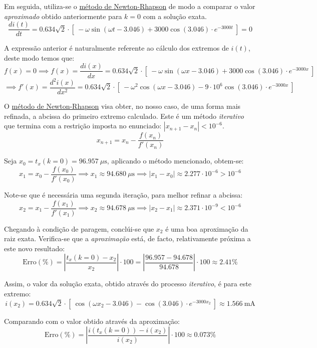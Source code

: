 Em seguida, utiliza-se o \underline{método de Newton-Rhapson} de modo a comparar o valor \textit{aproximado} obtido anteriormente para $k=0$ com a solução exata.
$$
    \frac{di(t)}{dt} = 0.634\sqrt{2}\cdot [\ -\omega\sin{(\omega t - 3.046)} + 3000\cos{(3.046)}\cdot e^{-3000t}\ ] = 0
$$

A expressão anterior é naturalmente referente ao cálculo dos extremos de $i(t)$, deste modo temos que:
$$
    f(x) = 0 \implies f(x) = \frac{di(x)}{dx} = 0.634\sqrt{2}\cdot [\ -\omega\sin{(\omega x - 3.046)} + 3000\cos{(3.046)}\cdot e^{-3000x}\ ]
$$
$$
    \implies f'(x) = \frac{d^2i(x)}{dx^2} = 0.634\sqrt{2}\cdot [\ -\omega^2\cos{(\omega x - 3.046)} - 9\cdot 10^{6}\cos{(3.046)}\cdot e^{-3000x}\ ]
$$

O \underline{método de Newton-Rhapson} visa obter, no nosso caso, de uma forma mais refinada, a abcissa do primeiro extremo calculado. Este é um método \textit{iterativo} que termina com a restrição imposta no enunciado: $\left\vert x_{n+1} - x_n\right\vert < 10^{-6}$.
\begin{equation}
    x_{n+1} = x_n - \frac{f(x_n)}{f'(x_n)}   
\end{equation}

Seja $x_0 = t_x(k=0) = 96.957\ \mu\text{s}$, aplicando o método mencionado, obtem-se:
$$
    x_{1} = x_{0} - \frac{f(x_0)}{f'(x_0)} \implies x_{1} \approx 94.680\ \mu\text{s} \implies \left\vert x_{1} - x_0\right\vert \approx 2.277 \cdot 10^{-6} > 10^{-6}
$$

Note-se que é necessária uma segunda iteração, para melhor refinar a abcissa:
$$
    x_{2} = x_{1} - \frac{f(x_1)}{f'(x_1)} \implies x_{2} \approx 94.678\ \mu\text{s} \implies \left\vert x_{2} - x_1\right\vert \approx 2.371 \cdot 10^{-9} < 10^{-6}
$$

Chegando à condição de paragem, conclúi-se que $x_2$ é uma boa aproximação da raiz exata. Verifica-se que a \textit{aproximação} está, de facto, relativamente próxima a este novo resultado:
$$
    \text{Erro}(\%) = \left\vert\frac{t_x(k=0)-x_2}{x_2}\right\vert \cdot 100 = \left\vert\frac{96.957-94.678}{94.678}\right\vert \cdot 100 \approx 2.41 \% 
$$

Assim, o valor da solução exata, obtido através do processo \textit{iterativo}, é para este extremo:
$$
    i(x_2) = 0.634\sqrt{2}\cdot [\ \cos{(\omega x_2 - 3.046)} - \cos{(3.046)}\cdot e^{-3000x_2}\ ] \approx 1.566\ \text{mA}
$$

Comparando com o valor obtido através da aproximação:
$$
    \text{Erro}(\%) = \left\vert\frac{i(t_x(k=0))-i(x_2)}{i(x_2)}\right\vert \cdot 100 \approx 0.073 \%
$$

